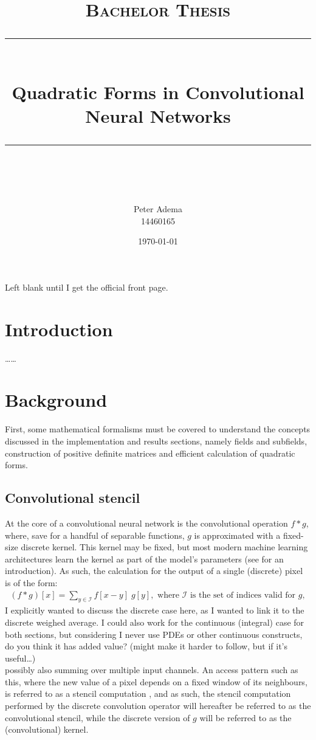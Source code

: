 \documentclass[11pt]{article} %
\title{	
    \vspace*{-1.5cm}
	\normalfont\normalsize
	\textsc{Bachelor Thesis}\\ %
	\vspace{3pt}
	\rule{\linewidth}{0.5pt}\\
	\vspace{14pt}
	{\huge Quadratic Forms in Convolutional Neural Networks}\\ %
	\vspace{4pt}
	\rule{\linewidth}{2pt}\\
	\vspace{4pt}
}
\author{
    \Large Peter Adema \\ 14460165
}
\date{\normalsize\today}  %
\def\comment#1{\color{red}#1\color{black}}
\begin{document}
\maketitle %

\comment{Left blank until I get the official front page.}
\newpage

\section{Introduction}
\comment{\ldots\ldots}
\section{Background}
First, some mathematical formalisms must be covered to understand the concepts discussed in the implementation and results sections, namely fields and subfields, construction of positive definite matrices and efficient calculation of quadratic forms.

\subsection{Convolutional stencil}
At the core of a convolutional neural network is the convolutional operation $f*g$, where, save for a handful of separable functions, $g$ is approximated with a fixed-size discrete kernel. This kernel may be fixed, but most modern machine learning architectures learn the kernel as part of the model's parameters (see  for an introduction). As such, the calculation for the output of a single (discrete) pixel is of the form:
\begin{align*}
(f*g)[x] = \sum_{y\in\mathcal{I}} f[x-y]\; g[y]	, \textrm{ where } \mathcal{I} \textrm{ is the set of indices valid for }g,
\end{align*}
\comment{I explicitly wanted to discuss the discrete case here, as I wanted to link it to the discrete weighed average. I could also work for the continuous (integral) case for both sections, but considering I never use PDEs or other continuous constructs, do you think it has added value? (might make it harder to follow, but if it's useful\ldots) \\}
possibly also summing over multiple input channels. An access pattern such as this, where the new value of a pixel depends on a fixed window of its neighbours, is referred to as a stencil computation \cite{fortranstencils}, and as such, the stencil computation performed by the discrete convolution operator will hereafter be referred to as the convolutional stencil, while the discrete version of $g$ will be referred to as the (convolutional) kernel.
\end{document}
